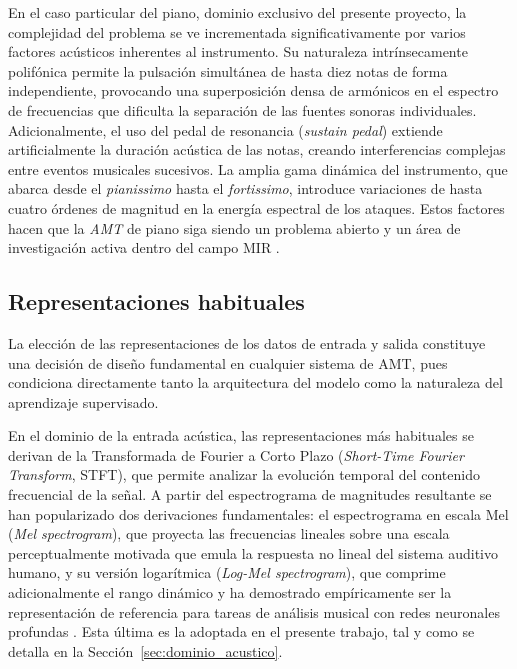 En el caso particular del piano, dominio exclusivo del presente proyecto, la complejidad
del problema se ve incrementada significativamente por varios factores acústicos inherentes
al instrumento. Su naturaleza intrínsecamente polifónica permite la pulsación simultánea
de hasta diez notas de forma independiente, provocando una superposición densa de
armónicos en el espectro de frecuencias que dificulta la separación de las fuentes sonoras
individuales. Adicionalmente, el uso del pedal de resonancia (\textit{sustain pedal})
extiende artificialmente la duración acústica de las notas, creando interferencias complejas
entre eventos musicales sucesivos. La amplia gama dinámica del instrumento, que abarca
desde el \textit{pianissimo} hasta el \textit{fortissimo}, introduce variaciones de hasta
cuatro órdenes de magnitud en la energía espectral de los ataques. Estos factores hacen
que la \textit{AMT} de piano siga siendo un problema abierto y un área de investigación
activa dentro del campo MIR \cite{benetos2019automatic}.
 
\subsection{Representaciones habituales}
 
La elección de las representaciones de los datos de entrada y salida constituye una
decisión de diseño fundamental en cualquier sistema de AMT, pues condiciona
directamente tanto la arquitectura del modelo como la naturaleza del aprendizaje supervisado.
 
En el dominio de la entrada acústica, las representaciones más habituales se derivan de la
Transformada de Fourier a Corto Plazo (\textit{Short-Time Fourier Transform}, STFT),
que permite analizar la evolución temporal del contenido frecuencial de la señal. A partir
del espectrograma de magnitudes resultante se han popularizado dos derivaciones
fundamentales: el espectrograma en escala Mel (\textit{Mel spectrogram}), que proyecta
las frecuencias lineales sobre una escala perceptualmente motivada que emula la respuesta
no lineal del sistema auditivo humano, y su versión logarítmica (\textit{Log-Mel
spectrogram}), que comprime adicionalmente el rango dinámico y ha demostrado
empíricamente ser la representación de referencia para tareas de análisis musical con
redes neuronales profundas \cite{purwins2019deep}. Esta última es la adoptada en el
presente trabajo, tal y como se detalla en la Sección~\ref{sec:dominio_acustico}.
 
